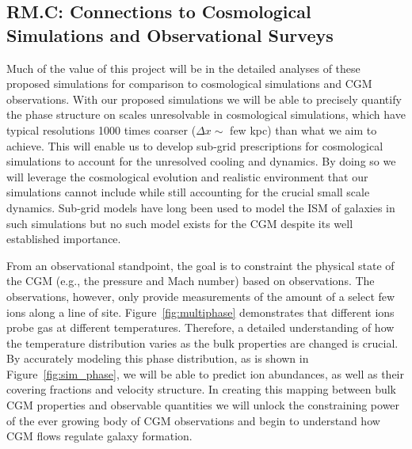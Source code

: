\documentclass[11pt,letterpaper,english]{article}
\begin{document}
\vspace{-.25in}
\subsection{RM.C: Connections to Cosmological Simulations and Observational Surveys}
\vspace{-.2in}

Much of the value of this project will be in the detailed analyses of these proposed simulations for comparison to cosmological simulations and CGM observations. With our proposed simulations we will be able to precisely quantify the phase structure on scales unresolvable in cosmological simulations, which have typical resolutions 1000 times coarser ($\Delta x \sim$ few kpc) than what we aim to achieve. This will enable us to develop sub-grid prescriptions for cosmological simulations to account for the unresolved cooling and dynamics. By doing so we will leverage the cosmological evolution and realistic environment that our simulations cannot include while still accounting for the crucial small scale dynamics. Sub-grid models have long been used to model the ISM of galaxies in such simulations \cite{SpringelHernquist} but no such model exists for the CGM despite its well established importance. 

From an observational standpoint, the goal is to constraint the physical state of the CGM (e.g., the pressure and Mach number) based on observations. The observations, however, only provide measurements of the amount of a select few ions along a line of site. Figure~\ref{fig:multiphase} demonstrates that different ions probe gas at different temperatures. Therefore, a detailed understanding of how the temperature distribution varies as the bulk properties are changed is crucial. By accurately modeling this phase distribution, as is shown in Figure~\ref{fig:sim_phase}, we will be able to predict ion abundances, as well as their covering fractions and velocity structure. In creating this mapping between bulk CGM properties and observable quantities we will unlock the constraining power of the ever growing body of CGM observations and begin to understand how CGM flows regulate galaxy formation.


\end{document}

